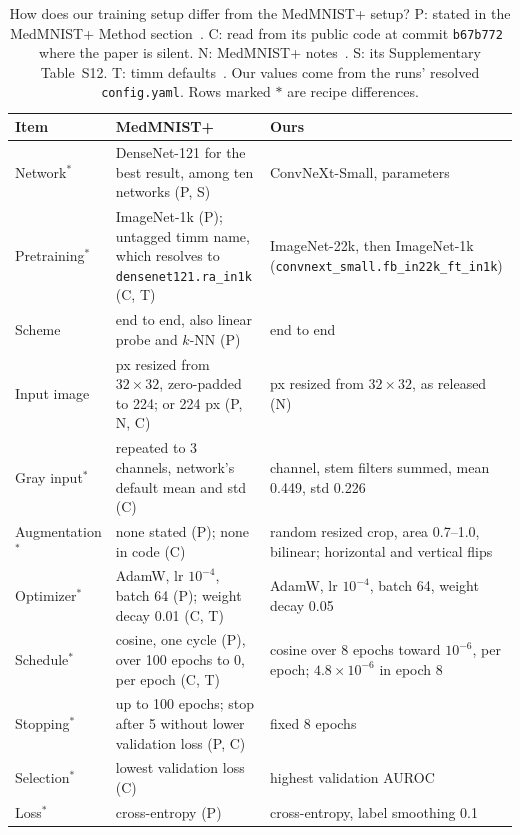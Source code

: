 \documentclass[conference]{IEEEtran}
\newif\ifanycitation
\let\citeAnyKey\cite
\renewcommand{\cite}{\global\anycitationtrue\citeAnyKey}
\begin{document}
\begin{table}[t]
\caption{How does our training setup differ from the MedMNIST+ setup? P: stated in the
MedMNIST+ Method section~\cite{doerrich2025medmnistplus}. C: read from its public code at
commit \texttt{b67b772}~\cite{doerrich2025medmnistpluscode} where the paper is silent. N:
MedMNIST+ notes~\cite{yang2024medmnistplusnotes}. S: its Supplementary Table~S12. T: timm
defaults~\cite{wightman2024timm103}. Our values come from the runs' resolved
\texttt{config.yaml}. Rows marked $\ast$ are recipe differences.}
\label{tab:setup}
\centering
\footnotesize
\renewcommand{\arraystretch}{1.08}
\begin{tabular}{@{}l>{\raggedright\arraybackslash}p{}>{\raggedright\arraybackslash}p{}@{}}
\toprule
Item & MedMNIST+ & Ours \\
\midrule
Network$^\ast$ & DenseNet-121 for the best result, among ten networks (P, S) & ConvNeXt-Small, \parameters{} parameters \\
Pretraining$^\ast$ & ImageNet-1k (P); untagged timm name, which resolves to \texttt{densenet121.ra\_in1k} (C, T) & ImageNet-22k, then ImageNet-1k (\texttt{convnext\_small.fb\_in22k\_ft\_in1k}) \\
Scheme & end to end, also linear probe and $k$-NN (P) & end to end \\
Input image & 128 px resized from $32\times32$, zero-padded to 224; or 224 px (P, N, C) & 224 px resized from $32\times32$, as released (N) \\
Gray input$^\ast$ & repeated to 3 channels, network's default mean and std (C) & 1 channel, stem filters summed, mean 0.449, std 0.226 \\
Augmentation$^\ast$ & none stated (P); none in code (C) & random resized crop, area 0.7--1.0, bilinear; horizontal and vertical flips \\
Optimizer$^\ast$ & AdamW, lr $10^{-4}$, batch 64 (P); weight decay 0.01 (C, T) & AdamW, lr $10^{-4}$, batch 64, weight decay 0.05 \\
Schedule$^\ast$ & cosine, one cycle (P), over 100 epochs to 0, per epoch (C, T) & cosine over 8 epochs toward $10^{-6}$, per epoch; $4.8\times10^{-6}$ in epoch 8 \\
Stopping$^\ast$ & up to 100 epochs; stop after 5 without lower validation loss (P, C) & fixed 8 epochs \\
Selection$^\ast$ & lowest validation loss (C) & highest validation AUROC \\
Loss$^\ast$ & cross-entropy (P) & cross-entropy, label smoothing 0.1 \\

\end{tabular}
\end{table}
\end{document}
